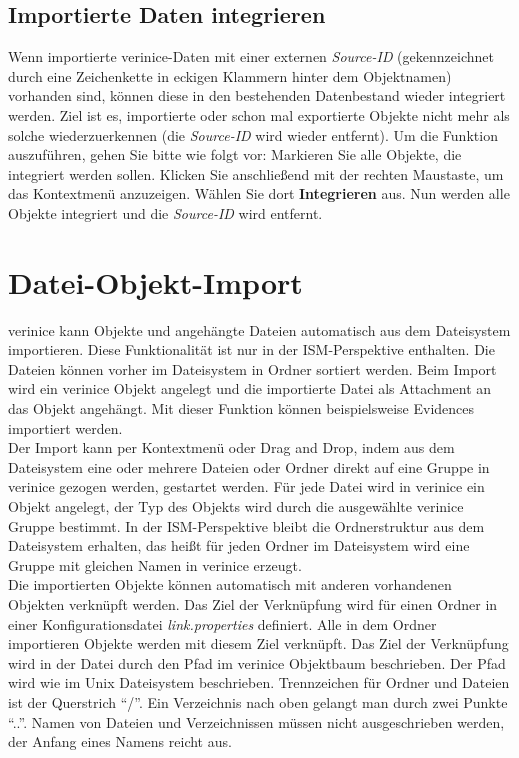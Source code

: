\documentclass[a4paper,10pt]{book}
\begin{document}
\subsection{Importierte Daten integrieren} \label{Importiere Daten integrieren}
Wenn importierte verinice-Daten mit einer externen \textit{Source-ID} (gekennzeichnet durch eine Zeichenkette in eckigen Klammern hinter dem Objektnamen) vorhanden sind, können diese in den bestehenden Datenbestand
wieder integriert werden. Ziel ist es, importierte oder schon mal exportierte Objekte nicht mehr als solche wiederzuerkennen (die \textit{Source-ID} wird wieder entfernt).
Um die Funktion auszuführen, gehen Sie bitte wie folgt vor: Markieren Sie alle Objekte, die integriert werden sollen. Klicken Sie anschließend mit der rechten Maustaste, um das Kontextmenü anzuzeigen.
Wählen Sie dort \textbf{Integrieren} aus. Nun werden alle Objekte integriert und die \textit{Source-ID} wird entfernt.

\section{Datei-Objekt-Import} \label{Datei-Objekt-Import}
verinice kann Objekte und angehängte Dateien automatisch aus dem Dateisystem importieren. Diese Funktionalität ist nur in der ISM-Perspektive enthalten. Die Dateien können vorher im Dateisystem in Ordner sortiert werden. Beim Import wird ein verinice Objekt angelegt und die importierte Datei als Attachment an das Objekt angehängt. Mit dieser Funktion können beispielsweise Evidences importiert werden.
\newline\\
Der Import kann per Kontextmenü oder Drag and Drop, indem aus dem Dateisystem eine oder mehrere Dateien oder Ordner direkt auf eine Gruppe in verinice gezogen werden, gestartet werden. Für jede Datei wird in verinice ein Objekt angelegt, der Typ des Objekts wird durch die ausgewählte verinice Gruppe bestimmt. In der ISM-Perspektive bleibt die Ordnerstruktur aus dem Dateisystem erhalten, das heißt für jeden Ordner im Dateisystem wird eine Gruppe mit gleichen Namen in verinice erzeugt.
\newline\\
Die importierten Objekte können automatisch mit anderen vorhandenen Objekten verknüpft
werden. Das Ziel der Verknüpfung wird für einen Ordner in einer Konfigurationsdatei
\textit{link.properties} definiert. Alle in dem Ordner importieren Objekte werden mit diesem Ziel
verknüpft. Das Ziel der Verknüpfung wird in der Datei durch den Pfad im verinice Objektbaum
beschrieben. Der Pfad wird wie im Unix Dateisystem beschrieben. Trennzeichen für Ordner und
Dateien ist der Querstrich ``/''. Ein Verzeichnis nach oben gelangt man durch zwei Punkte ``..''.
Namen von Dateien und Verzeichnissen müssen nicht ausgeschrieben werden, der Anfang eines
Namens reicht aus.
\end{document}
